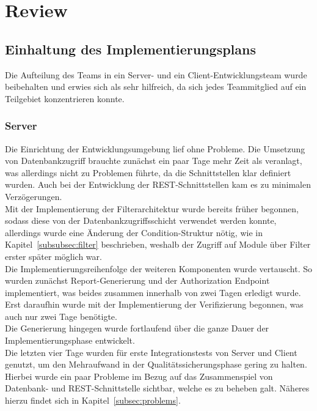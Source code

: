 \section{Review}
\subsection{Einhaltung des Implementierungsplans}
Die Aufteilung des Teams in ein Server- und ein Client-Entwicklungsteam wurde beibehalten und erwies sich als sehr hilfreich, da sich jedes Teammitglied auf ein Teilgebiet konzentrieren konnte.
\subsubsection{Server}
Die Einrichtung der Entwicklungsumgebung lief ohne Probleme. Die Umsetzung von Datenbankzugriff brauchte zunächst ein paar Tage mehr Zeit als veranlagt, was allerdings nicht zu Problemen führte, da die Schnittstellen klar definiert wurden. Auch bei der Entwicklung der REST-Schnittstellen kam es zu minimalen Verzögerungen.\\
 Mit der Implementierung der Filterarchitektur wurde bereits früher begonnen, sodass diese von der Datenbankzugriffsschicht verwendet werden konnte, allerdings wurde eine Änderung der Condition-Struktur nötig, wie in Kapitel~\ref{subsubsec:filter} beschrieben, weshalb der Zugriff auf Module über Filter erster später möglich war.\\
 Die Implementierungsreihenfolge der weiteren Komponenten wurde vertauscht. So wurden zunächst Report-Generierung und der Authorization Endpoint implementiert, was beides zusammen innerhalb von zwei Tagen erledigt wurde. Erst daraufhin wurde mit der Implementierung der Verifizierung begonnen, was auch nur zwei Tage benötigte. \\
 Die Generierung hingegen wurde fortlaufend über die ganze Dauer der Implementierungsphase entwickelt. \\
 Die letzten vier Tage wurden für erste Integrationstests von Server und Client genutzt, um den Mehraufwand in der Qualitätssicherungsphase gering zu halten. Hierbei wurde ein paar Probleme im Bezug auf das Zusammenspiel von Datenbank- und REST-Schnittstelle sichtbar, welche es zu beheben galt. Näheres hierzu findet sich in Kapitel~\ref{subsec:problems}.
 
 
